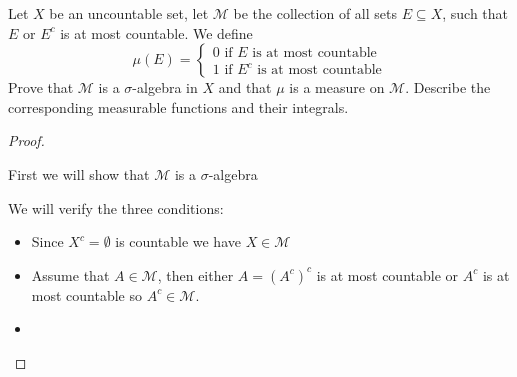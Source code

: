     \begin{exercise}
        Let $X$ be an uncountable set, let $\mathcal{M}$ be the collection of all sets $E\subseteq X$, such that $E$ or $E^c$ is at most countable. We define \[\mu(E) = \begin{cases}
            0 \text{ if }E \text{ is at most countable}\\
            1 \text{ if }E^c\text{ is at most countable}
        \end{cases}\]
        Prove that $\mathcal{M}$ is a $\sigma$-algebra in $X$ and that $\mu$ is a measure on $\mathcal{M}$. Describe the corresponding measurable functions and their integrals.

        \begin{proof}

            \

            \begin{center}
                First we will show that $\mathcal{M}$ is a $\sigma$-algebra
            \end{center}
            We will verify the three conditions:
            \begin{itemize}
                \item Since $X^c = \emptyset$ is countable we have $X\in \mathcal{M}$
                \item Assume that $A\in \mathcal{M}$, then either $A = {(A^c)}^c$ is at most countable or $A^c$ is at most countable so $A^c\in \mathcal{M}$.
                \item  
            \end{itemize}
        \end{proof}
    \end{exercise}
 
